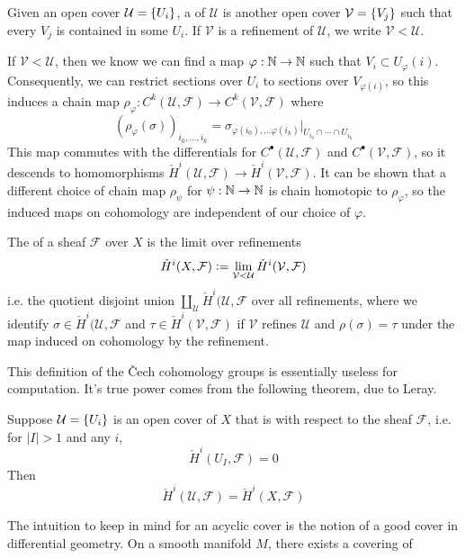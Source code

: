 %
\begin{defn}
Given an open cover $\mathcal{U} = \left\lbrace U_i \right\rbrace$, a  of $\mathcal{U}$
is another open cover $\mathcal{V} = \left\lbrace V_j \right\rbrace$ such that every $V_j$ is contained
in some $U_i$. If $\mathcal{V}$ is a refinement of $\mathcal{U}$, we write
$\mathcal{V} < \mathcal{U}$.
\end{defn}
%
If $\mathcal{V} < \mathcal{U}$, then we know we can find a map
$\varphi : \mathbb{N} \to \mathbb{N}$ such that $V_i \subset U_\varphi(i)$. Consequently, we
can restrict sections over $U_i$ to sections over $V_{\varphi(i)}$, so this
induces a chain map
$\rho_\varphi : C^k(\mathcal{U}, \mathcal{F}) \to C^k(\mathcal{V},\mathcal{F})$
where
\[
(\rho_\varphi(\sigma))_{i_0,\ldots, i_k}
= \sigma_{\varphi(i_0),\ldots \varphi(i_k)}\vert_{U_{i_0} \cap \cdots \cap U_{i_k}}
\]
This map commutes with the differentials for $C^\bullet(\mathcal{U},\mathcal{F})$
and $C^\bullet(\mathcal{V},\mathcal{F})$, so it descends to homomorphisms
$\check{H}^i(\mathcal{U},\mathcal{F}) \to \check{H}^i(\mathcal{V}, \mathcal{F})$.
It can be shown that a different choice of chain map $\rho_\psi$ for
$\psi : \mathbb{N} \to \mathbb{N}$ is chain homotopic to $\rho_\varphi$, so the induced maps
on cohomology are independent of our choice of $\varphi$.
%
\begin{defn}
The  of a sheaf $\mathcal{F}$ over $X$ is the limit over
refinements
\[
\check{H}^i(X, \mathcal{F})
\vcentcolon= \lim_{\mathcal{V} < \mathcal{U}} \check{H}^i(\mathcal{V}, \mathcal{F})
\]
i.e. the quotient disjoint union
$\amalg_\mathcal{U}\check{H}^i(\mathcal{U}, \mathcal{F}$
over all refinements, where we identify $\sigma \in \check{H}^i(\mathcal{U}, \mathcal{F}$
and $\tau \in \check{H}^i(\mathcal{V}, \mathcal{F})$ if
$\mathcal{V}$ refines $\mathcal{U}$ and $\rho(\sigma) = \tau$ under the map induced on
cohomology by the refinement.
\end{defn}
%
This definition of the \v{C}ech cohomology groups is essentially useless for
computation. It's true power comes from the following theorem, due to Leray.
%
\begin{thm}[\ib{Leray}]
Suppose $\mathcal{U} = \left\lbrace U_i \right\rbrace$ is an open cover of $X$ that is  with
respect to the sheaf $\mathcal{F}$, i.e. for $|I| > 1$ and any $i$,
\[
\check{H}^i(U_I, \mathcal{F}) = 0
\]
Then
\[
\check{H}^i(\mathcal{U}, \mathcal{F}) = \check{H}^i(X, \mathcal{F})
\]
\end{thm}
%
The intuition to keep in mind for an acyclic cover is the notion of a good cover
in differential geometry. On a smooth manifold $M$, there exists a covering of
